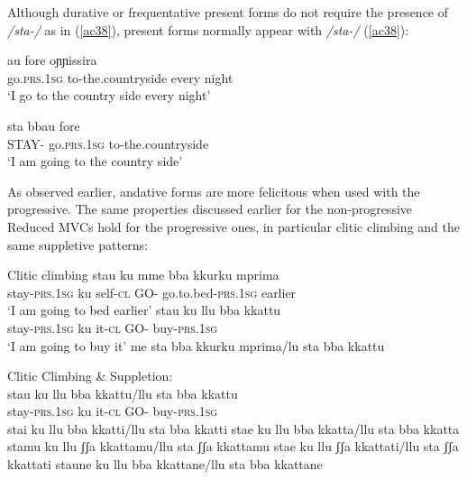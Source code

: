 \documentclass[output=paper]{langscibook}
\begin{document}
\ea\label{ac37}
    \z
\z

Although durative or frequentative present forms do not require the presence of \textit{/sta-/} as in (\ref{ac38}), present forms normally appear with \textit{/sta-/} (\ref{ac38}):

\ea \label{ac38}\gll  au        fore         oɲɲissira\\
   go.\textsc{prs}.\textsc{1sg}  to-the.countryside every night\\
 \glt  ‘I go to the country side every night’
\z

\ea \label{ac39}\gll sta    bbau       fore\\
   STAY- go.\textsc{prs}.\textsc{1sg}  to-the.countryside \\
\glt   ‘I am going to the country side’
\z

As observed earlier, andative forms are more felicitous when used with the progressive. The same properties discussed earlier for the non-progressive Reduced MVCs hold for the progressive ones, in particular clitic climbing and the same suppletive patterns:

\ea \label{ac40}Clitic climbing
    \ea \label{ac40a}
        \ea \gll stau       ku  mme   bba  kkurku      mprima\\
      stay-\textsc{prs}.\textsc{1sg} ku self-\textsc{cl}  GO- go.to.bed-\textsc{prs}.\textsc{1sg} earlier\\
      \glt ‘I am going to bed earlier’
        \ex \gll stau       ku   llu   bba   kkattu\\
      stay-\textsc{prs}.\textsc{1sg}  ku   it-\textsc{cl}  GO-  buy-\textsc{prs}.\textsc{1sg}\\
      \glt ‘I am going to buy it’
        \z
    \ex \label{ac40b}me sta bba kkurku mprima/lu sta bba kkattu
    \z
\z

\ea \label{ac41}Clitic Climbing \& Suppletion:\\
    \gll stau    ku     llu   bba  kkattu/llu sta bba kkattu\\
    stay-\textsc{prs}.\textsc{1sg} ku  it-\textsc{cl}  GO-  buy-\textsc{prs}.\textsc{1sg}\\
    \glt stai ku llu bba kkatti/llu sta bba kkatti 
    stae ku llu bba kkatta/llu sta bba kkatta      
    stamu ku llu ʃʃa kkattamu/llu sta ʃʃa kkattamu 
    stae ku llu ʃʃa kkattati/llu sta ʃʃa kkattati  
    staune ku llu bba kkattane/llu sta bba kkattane
\z
\end{document}

